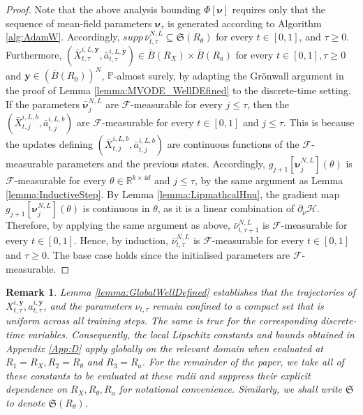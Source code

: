 \documentclass{article}
\newtheorem{remark}[theorem]{Remark}
\newcommand{\R}{\mathbb{R}}
\begin{document}
\begin{appendices}
\begin{proof}
Note that the above analysis bounding $\Phi[\bm\nu]$ requires only that the sequence of mean-field parameters $\bm\nu_\tau$
is generated according to Algorithm \ref{alg:AdamW}. Accordingly, $supp\,\bar \nu^{N,L}_{t,\tau}\subseteq \mathfrak{S}(R_\theta)$ for every $t\in[0,1]$, and $\tau\ge 0$. Furthermore, $(\bar X^{i,L,\bm{y}}_{t,\tau},\bar a^{i,L,\bm{y}}_{t,\tau})\in \bar B(R_X)\times \bar B(R_a)$ for every $t\in[0,1],\tau\ge 0$ and $\bm{y}\in (\bar B(R_0))^N$, $\mathbb P$-almost surely, by adapting the Gr\"onwall argument in the proof of Lemma \ref{lemma:MVODE_WellDEfined} to the discrete-time setting. If the parameters $\bm{\bar\nu}^{N,L}_j$ are $\mathcal F$-measurable for every $j \le \tau$, then the $(\bar X^{i,L,b}_{t,j},\bar a^{i,L,b}_{t,j})$ are $\mathcal F$-measurable for every $t\in[0,1]$ and $j\le \tau$. This is because the updates defining $(\bar X^{i,L,b}_{t,j},\bar a^{i,L,b}_{t,j})$ are continuous functions of the $\mathcal F$-measurable parameters and the previous states. Accordingly, $g_{j+1}[\bm{\nu}^{N,L}_j](\theta)$ is $\mathcal F$-measurable for every $\theta\in \R^{k\times 4d}$ and $j\le \tau$, by the same argument as Lemma \ref{lemma:InductiveStep}. By Lemma \ref{lemma:LipmathcalHnu}, the gradient map $g_{j+1}[\bm{\nu}^{N,L}_j](\theta)$  is continuous in $\theta$, as it is a linear combination of $\partial_\nu\mathcal H$. Therefore, by applying the same argument as above, $\bar{\nu}^{N,L}_{t,\tau+1}$ is $\mathcal F$-measurable for every $t\in[0,1]$. Hence, by induction, $\bar{\nu}^{N,L}_{t,\tau}$ is $\mathcal F$-measurable  for every $t\in[0,1]$ and $\tau\ge 0$. The base case holds since the initialised parameters are $\mathcal F$-measurable.
\end{proof}
\begin{remark}\label{remark:GlobalLip}
Lemma \ref{lemma:GlobalWellDefined} establishes that the trajectories of $X^{i,\bm{y}}_{t,\tau}, a^{i,\bm{y}}_{t,\tau}$, and the parameters $\nu_{t,\tau}$ remain confined to a compact set that is uniform across all training steps. The same is true for the corresponding discrete-time variables. Consequently, the local Lipschitz constants and bounds obtained in Appendix \ref{App:D} apply globally on the relevant domain when evaluated at $R_1=R_X, R_2=R_\theta$ and $R_3=R_a$. For the remainder of the paper, we take all of these constants to be evaluated at these radii and suppress their explicit dependence on $R_X,R_\theta,R_a$ for notational convenience. Similarly, we shall write $\mathfrak{S}$ to denote $\mathfrak{S}(R_\theta)$.
\end{remark}

\end{appendices}
\end{document}
